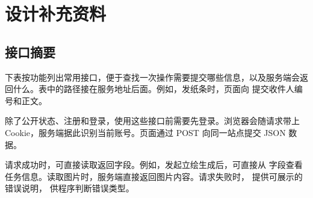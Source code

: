 % 
% 
% 
%

\appendix
\chapter{设计补充资料}
\label{chap:appendix-design-compact}

\section{接口摘要}
下表按功能列出常用接口，便于查找一次操作需要提交哪些信息，以及服务端会返回什么。表中的路径接在服务地址后面。例如，发纸条时，页面向  提交收件人编号和正文。

除了公开状态、注册和登录，使用这些接口前需要先登录。浏览器会随请求带上  Cookie，服务端据此识别当前账号。页面通过 POST 向同一站点提交 JSON 数据。

请求成功时，可直接读取返回字段。例如，发起立绘生成后，可直接从  字段查看任务信息。读取图片时，服务端直接返回图片内容。请求失败时， 提供可展示的错误说明， 供程序判断错误类型。

